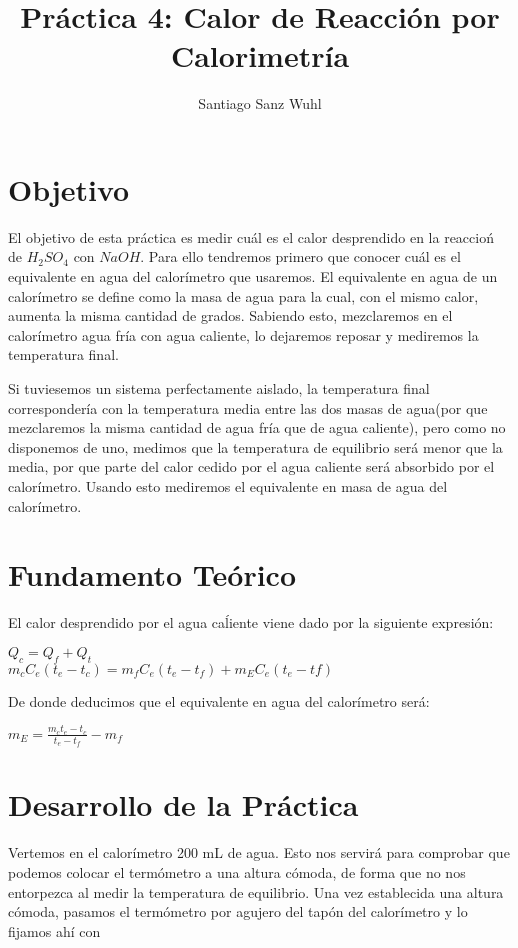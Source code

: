 \documentclass[11pt,a4paper]{article}
\author{Santiago Sanz Wuhl}
\title{Práctica 4: Calor de Reacción por Calorimetría}
\begin{document}
\maketitle
\section{Objetivo}
\quad El objetivo de esta práctica es medir cuál es el calor desprendido en la reaccioń de $H_{2}SO_{4}$ con $NaOH$. Para ello tendremos primero que conocer cuál es el equivalente en agua del calorímetro que usaremos. El equivalente en agua de un calorímetro se define como la masa de agua para la cual, con el mismo calor, aumenta la misma cantidad de grados. Sabiendo esto, mezclaremos en el calorímetro agua fría con agua caliente, lo dejaremos reposar y mediremos la temperatura final. 

Si tuviesemos un sistema perfectamente aislado, la temperatura final correspondería con la temperatura media entre las dos masas de agua(por que mezclaremos la misma cantidad de agua fría que de agua caliente), pero como no disponemos de uno, medimos que la temperatura de equilibrio será menor que la media, por que parte del calor cedido por el agua caliente será absorbido por el calorímetro. Usando esto mediremos el equivalente en masa de agua del calorímetro. 
\section{Fundamento Teórico}
\quad El calor desprendido por el agua caĺiente viene dado por la siguiente expresión:
\begin{center}
$Q_{c} = Q_{f} + Q_{t}$ \\
$m_{c}C_{e}(t_{e}-t_{c})=m_{f}C_{e}(t_{e}-t_{f})+m_{E}C_{e}(t_{e}-t{f})$ \\
\end{center}
De donde deducimos que el equivalente en agua del calorímetro será:
\begin{center}
$m_{E} = \frac{m_{c}t_{e}-t_{c}}{t_{e}-t_{f}} - m_{f}$
\end{center}
\section{Desarrollo de la Práctica}
Vertemos en el calorímetro 200 mL de agua. Esto nos servirá para comprobar que podemos colocar el termómetro a una altura cómoda, de forma que no nos entorpezca al medir la temperatura de equilibrio. Una vez establecida una altura cómoda, pasamos el termómetro por agujero del tapón del calorímetro y lo fijamos ahí con 
\quad 
\end{document}
